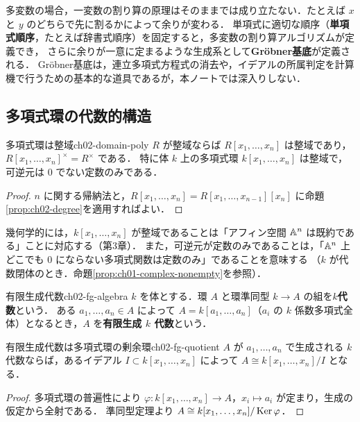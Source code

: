 多変数の場合，一変数の割り算の原理はそのままでは成り立たない．たとえば $x$ と $y$ のどちらで先に割るかによって余りが変わる．
単項式に適切な順序（\textbf{単項式順序}，たとえば辞書式順序）を固定すると，多変数の割り算アルゴリズムが定義でき，
さらに余りが一意に定まるような生成系として\textbf{Gröbner基底}が定義される．
Gröbner基底は，連立多項式方程式の消去や，イデアルの所属判定を計算機で行うための基本的な道具であるが，本ノートでは深入りしない．

\subsection{多項式環の代数的構造}

\begin{myprop}{多項式環は整域}{ch02-domain-poly}
$R$ が整域ならば $R[x_1,\dots,x_n]$ は整域であり，$R[x_1,\dots,x_n]^\times=R^\times$ である．
特に体 $k$ 上の多項式環 $k[x_1,\dots,x_n]$ は整域で，可逆元は $0$ でない定数のみである．
\end{myprop}

\begin{proof}
$n$ に関する帰納法と，$R[x_1,\dots,x_n]=R[x_1,\dots,x_{n-1}][x_n]$ に命題\ref{prop:ch02-degree}を適用すればよい．
\end{proof}

幾何学的には，$k[x_1,\dots,x_n]$ が整域であることは「アフィン空間 $\mathbb{A}^n$ は既約である」ことに対応する（第3章）．
また，可逆元が定数のみであることは，「$\mathbb{A}^n$ 上どこでも $0$ にならない多項式関数は定数のみ」であることを意味する
（$k$ が代数閉体のとき．命題\ref{prop:ch01-complex-nonempty}を参照）．

\begin{mydef}{有限生成代数}{ch02-fg-algebra}
$k$ を体とする．環 $A$ と環準同型 $k\to A$ の組を\textbf{$k$代数}という．
ある $a_1,\dots,a_n\in A$ によって $A=k[a_1,\dots,a_n]$（$a_i$ の $k$ 係数多項式全体）となるとき，$A$ を\textbf{有限生成 $k$ 代数}という．
\end{mydef}

\begin{myprop}{有限生成代数は多項式環の剰余環}{ch02-fg-quotient}
$A$ が $a_1,\dots,a_n$ で生成される $k$ 代数ならば，あるイデアル $I\subset k[x_1,\dots,x_n]$ によって $A\cong k[x_1,\dots,x_n]/I$ となる．
\end{myprop}

\begin{proof}
多項式環の普遍性により $\varphi:k[x_1,\dots,x_n]\to A$，$x_i\mapsto a_i$ が定まり，生成の仮定から全射である．
準同型定理より $A\cong k[x_1,\dots,x_n]/\operatorname{Ker}\varphi$．
\end{proof}

